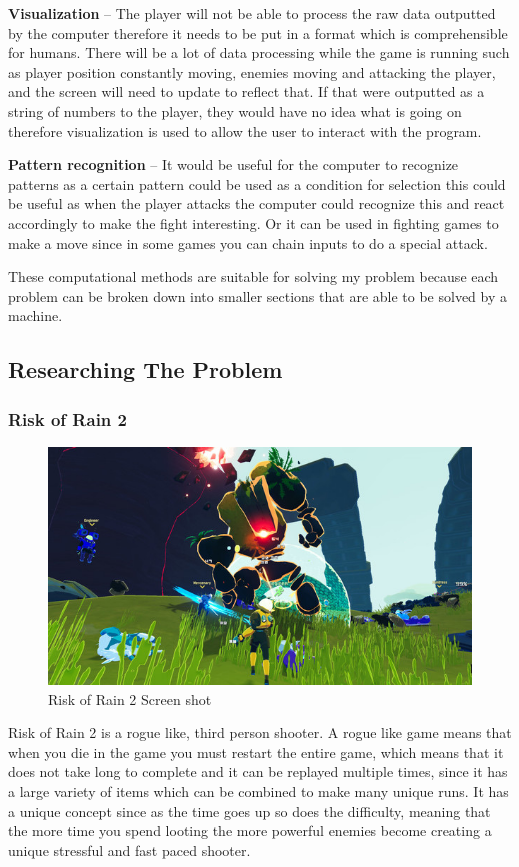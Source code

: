 \documentclass{article}
\newcommand{\parBr}{\vspace{5mm}}%
\begin{document}
\textbf{Visualization} – The player will not be able to process the raw data outputted by the computer therefore it needs to be put in a format which is comprehensible for humans. There will be a lot of data processing while the game is running such as player position constantly moving, enemies moving and attacking the player, and the screen will need to update to reflect that. If that were outputted as a string of numbers to the player, they would have no idea what is going on therefore visualization is used to allow the user to interact with the program.

\parBr

\textbf{Pattern recognition} – It would be useful for the computer to recognize patterns as a certain pattern could be used as a condition for selection this could be useful as when the player attacks the computer could recognize this and react accordingly to make the fight interesting. Or it can be used in fighting games to make a move since in some games you can chain inputs to do a special attack.

\parBr

These computational methods are suitable for solving my problem because each problem can be broken down into smaller sections that are able to be solved by a machine. 

\subsection{Researching The Problem}

\subsubsection{Risk of Rain 2}

\begin{figure}[h]
\includegraphics[width=\linewidth]{ROR 2 ss}
\caption{\cite{ROR2ss} Risk of Rain 2 Screen shot}
\end{figure}
Risk of Rain 2 is a rogue like, third person shooter. A rogue like game means that when you die in the game you must restart the entire game, which means that it does not take long to complete and it can be replayed multiple times, since it has a large variety of items which can be combined to make many unique runs. It has a unique concept since as the time goes up so does the difficulty, meaning that the more time you spend looting the more powerful enemies become creating a unique stressful and fast paced shooter. 
\end{document}
